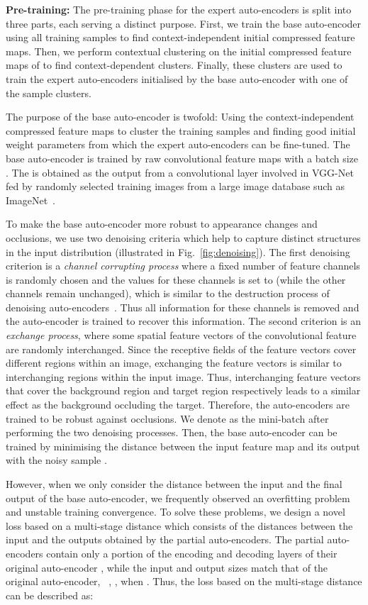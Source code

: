 \documentclass[10pt,twocolumn,letterpaper]{article}
\begin{document}
\textbf{Pre-training:}
The pre-training phase for the expert auto-encoders is split into three parts, each serving a distinct purpose. 
First, we train the base auto-encoder  using all training samples to find context-independent initial compressed feature maps. 
Then, we perform contextual clustering on the initial compressed feature maps of  to find  context-dependent clusters. Finally, these clusters are used to train the expert auto-encoders initialised by the base auto-encoder with one of the sample clusters. 

The purpose of the base auto-encoder is twofold: Using the context-independent compressed feature maps to cluster the training samples and finding good initial weight parameters from which the expert auto-encoders can be fine-tuned.
The base auto-encoder is trained by 
raw convolutional feature maps  with a batch size .
The  is obtained as the output from a convolutional layer involved in VGG-Net~\cite{ref:vggm} fed by randomly selected training images  from a large image database such as ImageNet~\cite{ref:ImageNet}.

To make the base auto-encoder more robust to appearance changes and occlusions, we use two denoising criteria which help to capture distinct structures in the input distribution (illustrated in Fig.~\ref{fig:denoising}). 
The first denoising criterion is a {\it channel corrupting process} where a fixed number of feature channels is randomly chosen and the values for these channels is set to  (while the other channels remain unchanged), which is similar to the destruction process of denoising auto-encoders~\cite{ref:dAE}.
Thus all information for these channels is removed and the auto-encoder is trained to recover this information. 
The second criterion is an {\it exchange process}, where some spatial feature vectors of the convolutional feature are randomly interchanged.
Since the receptive fields of the feature vectors cover different regions within an image, exchanging the feature vectors is similar to interchanging regions within the input image. Thus, interchanging feature vectors that cover the background region and target region respectively leads to a similar effect as the background occluding the target. Therefore, the auto-encoders are trained to be robust against occlusions.
We denote  as the mini-batch after performing the two denoising processes.
Then, the base auto-encoder  can be trained by minimising the distance between the input feature map  and its output  with the noisy sample . 


However, when we only consider the distance between the input and the final output of the base auto-encoder, we frequently observed an overfitting problem and unstable training convergence. To solve these problems, we design a novel loss based on a multi-stage distance which consists of the distances between the input and the outputs obtained by the partial auto-encoders. The partial auto-encoders  contain only a portion of the encoding and decoding layers of their original auto-encoder , while the input and output sizes match that of the original auto-encoder, \ie\ , ,  when . Thus, the loss based on the multi-stage distance can be described as:
\small
\end{document}
